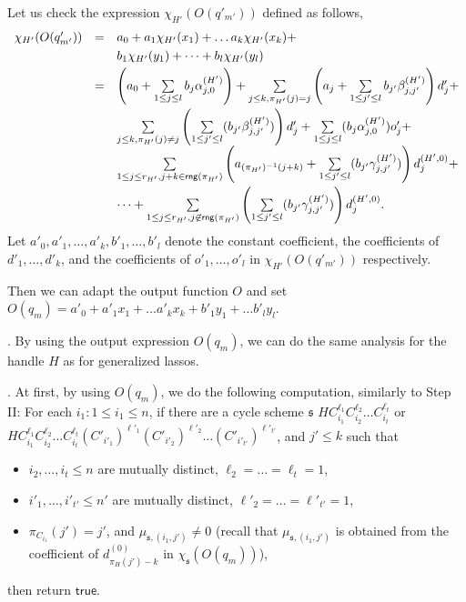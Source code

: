 \documentclass[runningheads,a4paper]{llncs}
\def\schm{{\mathfrak{s} }}
\newcommand\rng{\mathsf{rng}}
\newcommand\ltrue{\mathsf{true}}
\begin{document}
Let us check the expression $\chi_{H'}(O(q'_{m'}))$ defined as follows,
\[
\begin{array}{l c l}
\smallskip
\chi_{H'}(O(q'_{m'})) & = & a_0 + a_1 \chi_{H'}(x_1) + \dots a_k \chi_{H'}(x_k) + \\
\smallskip
& & b_1 \chi_{H'}(y_1) + \dots + b_l \chi_{H'}(y_l) \\
\smallskip
&  = &  \left(a_0+\sum \limits_{1 \le j \le l} b_j \alpha^{(H')}_{j,0} \right) + \sum \limits_{j \le k, \pi_{H'}(j)=j} \left(a_j + \sum \limits_{1 \le j' \le l} b_{j'} \beta^{(H')}_{j,j'} \right) d'_j  + \\
%
& & \sum \limits_{j \le k, \pi_{H'}(j) \neq j} \left(\sum \limits_{1 \le j' \le l} (b_{j'} \beta^{(H')}_{j,j'})\right) d'_j + \sum \limits_{1\le j \le l} (b_{j} \alpha^{(H')}_{j,0}) o'_{j} + \\
\smallskip
%
& & \sum \limits_{1 \le j \le r_{H'}, j+k \in \rng(\pi_{H'})} \left(a_{(\pi_{H'})^{-1}(j+k)}+\sum \limits_{1 \le j' \le l} (b_{j'} \gamma^{(H')}_{j,j'})\right) d^{(H',0)}_j +\\ & & \dots  + \sum \limits_{1 \le j \le r_{H'}, j \not \in \rng(\pi_{H'})} \left(\sum \limits_{1 \le j' \le l} (b_{j'} \gamma^{(H')}_{j,j'})\right) d^{(H',0)}_j.
\end{array}
\] 
Let $a'_0,a'_1,\dots,a'_k,b'_1,\dots,b'_l$ denote the constant coefficient, the coefficients of $d'_1,\dots,d'_k$, and the coefficients of $o'_1,\dots,o'_l$ in $\chi_{H'}(O(q'_{m'}))$ respectively. 

Then we can adapt the output function $O$ and set $O(q_m) = a'_0 + a'_1 x_1 + \dots a'_k x_k + b'_1 y_1 + \dots b'_l y_l$.


\smallskip

. By using the output expression $O(q_m)$, we can do the same analysis for the handle $H$ as for generalized lassos.

\smallskip 
{}. At first, by using $O(q_m)$, we do the following computation, similarly to Step II: For each $i_1: 1 \le i_1 \le n$, if there are a cycle scheme $\schm$  
$HC_{i_1}^{\ell_1} C_{i_2}^{\ell_2} \dots C_{i_t}^{\ell_t}
$
or 
$HC_{i_1}^{\ell_1} C_{i_2}^{\ell_2} \dots C_{i_t}^{\ell_t} (C'_{i'_1})^{\ell'_1} (C'_{i'_2})^{\ell'_2} \dots (C'_{i'_{t'}})^{\ell'_{t'}}$,
and $j' \le k$ such that 
\begin{itemize}
\item $i_2,\dots,i_t \le n$ are mutually distinct, $\ell_2 = \dots = \ell_t = 1$, 
%
\item $i'_1,\dots,i'_{t'} \le n'$ are mutually distinct, $\ell'_2 = \dots = \ell'_{t'} = 1$, 
%
\item $\pi_{C_{i_1}}(j')=j'$, and $\mu_{\schm,(i_1,j')} \neq 0$ (recall that $\mu_{\schm,(i_1,j')}$ is obtained from the coefficient of $d^{(0)}_{\pi_H(j')-k}$ in  $\chi_\schm(O(q_m))$), 
\end{itemize}
then return $\ltrue$. 
\end{document}
